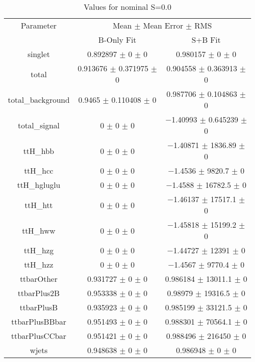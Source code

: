 \begin{table}
\centering
\caption{Values for nominal S=0.0}
\begin{tabular}{ccc}
\toprule
Parameter & \multicolumn{2}{c}{Mean $\pm$ Mean Error $\pm$ RMS}\\
 & B-Only Fit & S+B Fit\\
\midrule
singlet & \num{0.892897} $\pm$ \num{0} $\pm$ \num{0} & \num{0.980157} $\pm$ \num{0} $\pm$ \num{0}\\
total & \num{0.913676} $\pm$ \num{0.371975} $\pm$ \num{0} & \num{0.904558} $\pm$ \num{0.363913} $\pm$ \num{0}\\
total\_background & \num{0.9465} $\pm$ \num{0.110408} $\pm$ \num{0} & \num{0.987706} $\pm$ \num{0.104863} $\pm$ \num{0}\\
total\_signal & \num{0} $\pm$ \num{0} $\pm$ \num{0} & \num{-1.40993} $\pm$ \num{0.645239} $\pm$ \num{0}\\
ttH\_hbb & \num{0} $\pm$ \num{0} $\pm$ \num{0} & \num{-1.40871} $\pm$ \num{1836.89} $\pm$ \num{0}\\
ttH\_hcc & \num{0} $\pm$ \num{0} $\pm$ \num{0} & \num{-1.4536} $\pm$ \num{9820.7} $\pm$ \num{0}\\
ttH\_hgluglu & \num{0} $\pm$ \num{0} $\pm$ \num{0} & \num{-1.4588} $\pm$ \num{16782.5} $\pm$ \num{0}\\
ttH\_htt & \num{0} $\pm$ \num{0} $\pm$ \num{0} & \num{-1.46137} $\pm$ \num{17517.1} $\pm$ \num{0}\\
ttH\_hww & \num{0} $\pm$ \num{0} $\pm$ \num{0} & \num{-1.45818} $\pm$ \num{15199.2} $\pm$ \num{0}\\
ttH\_hzg & \num{0} $\pm$ \num{0} $\pm$ \num{0} & \num{-1.44727} $\pm$ \num{12391} $\pm$ \num{0}\\
ttH\_hzz & \num{0} $\pm$ \num{0} $\pm$ \num{0} & \num{-1.4567} $\pm$ \num{9770.4} $\pm$ \num{0}\\
ttbarOther & \num{0.931727} $\pm$ \num{0} $\pm$ \num{0} & \num{0.986184} $\pm$ \num{13011.1} $\pm$ \num{0}\\
ttbarPlus2B & \num{0.953338} $\pm$ \num{0} $\pm$ \num{0} & \num{0.98979} $\pm$ \num{19316.5} $\pm$ \num{0}\\
ttbarPlusB & \num{0.935923} $\pm$ \num{0} $\pm$ \num{0} & \num{0.985199} $\pm$ \num{33121.5} $\pm$ \num{0}\\
ttbarPlusBBbar & \num{0.951493} $\pm$ \num{0} $\pm$ \num{0} & \num{0.988301} $\pm$ \num{70564.1} $\pm$ \num{0}\\
ttbarPlusCCbar & \num{0.951421} $\pm$ \num{0} $\pm$ \num{0} & \num{0.988496} $\pm$ \num{216450} $\pm$ \num{0}\\
wjets & \num{0.948638} $\pm$ \num{0} $\pm$ \num{0} & \num{0.986948} $\pm$ \num{0} $\pm$ \num{0}\\
\bottomrule
\end{tabular}
\end{table}